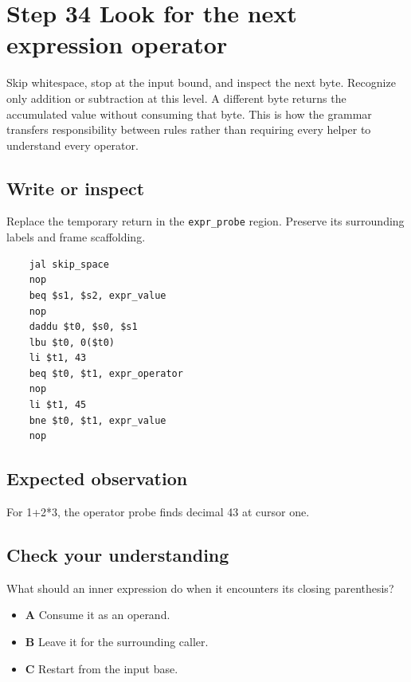 \section{Step 34 Look for the next expression operator}\label{expression-s34}

Skip whitespace, stop at the input bound, and inspect the next byte. Recognize only addition or subtraction at this level. A different byte returns the accumulated value without consuming that byte. This is how the grammar transfers responsibility between rules rather than requiring every helper to understand every operator.

\subsection{Write or inspect}
Replace the temporary return in the \texttt{expr\_probe} region. Preserve its surrounding labels and frame scaffolding.

\begin{verbatim}
    jal skip_space
    nop
    beq $s1, $s2, expr_value
    nop
    daddu $t0, $s0, $s1
    lbu $t0, 0($t0)
    li $t1, 43
    beq $t0, $t1, expr_operator
    nop
    li $t1, 45
    bne $t0, $t1, expr_value
    nop
\end{verbatim}
\subsection{Expected observation}
For 1+2*3, the operator probe finds decimal 43 at cursor one.

\subsection{Check your understanding}
What should an inner expression do when it encounters its closing parenthesis?

\begin{itemize}
  \item \textbf{A} Consume it as an operand.
  \item \textbf{B} Leave it for the surrounding caller.
  \item \textbf{C} Restart from the input base.
\end{itemize}

